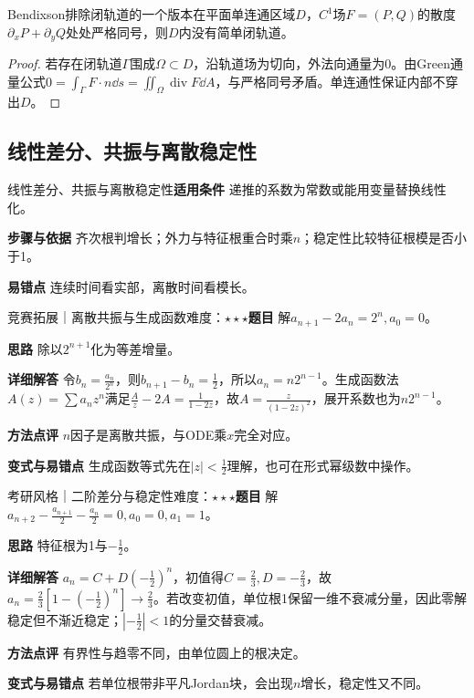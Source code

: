 \begin{theorem}{Bendixson排除闭轨道的一个版本}在平面单连通区域$D$，$C^1$场$F=(P,Q)$的散度$\partial_xP+\partial_yQ$处处严格同号，则$D$内没有简单闭轨道。\end{theorem}\begin{proof}若存在闭轨道$\Gamma$围成$\Omega\subset D$，沿轨道场为切向，外法向通量为0。由Green通量公式$0=\int_\Gamma F\cdot n\dd s=\iint_\Omega\operatorname{div}F\dd A$，与严格同号矛盾。单连通性保证内部不穿出$D$。\end{proof}

\subsection{线性差分、共振与离散稳定性}\label{deep:ode_qualitative_deep:difference}

\begin{method}{线性差分、共振与离散稳定性}\textbf{适用条件} 递推的系数为常数或能用变量替换线性化。\par\textbf{步骤与依据} 齐次根判增长；外力与特征根重合时乘$n$；稳定性比较特征根模是否小于1。\par\textbf{易错点} 连续时间看实部，离散时间看模长。\end{method}

\begin{example}{竞赛拓展｜离散共振与生成函数}{难度：$\star\star\star$}\label{deep:ex:ode_qualitative_deep:diffresonance}\textbf{题目} 解$a_{n+1}-2a_n=2^n,a_0=0$。\par\textbf{思路} 除以$2^{n+1}$化为等差增量。\par\textbf{详细解答} 令$b_n=\frac{a_n}{2^n}$，则$b_{n+1}-b_n=\frac{1}{2}$，所以$a_n=n2^{n-1}$。生成函数法$A(z)=\sum a_nz^n$满足$\frac{A}{z}-2A=\frac{1}{1-2z}$，故$A=\frac{z}{(1-2z)^2}$，展开系数也为$n2^{n-1}$。\par\textbf{方法点评} $n$因子是离散共振，与ODE乘$x$完全对应。\par\textbf{变式与易错点} 生成函数等式先在$|z|<\frac{1}{2}$理解，也可在形式幂级数中操作。\end{example}

\begin{example}{考研风格｜二阶差分与稳定性}{难度：$\star\star\star$}\label{deep:ex:ode_qualitative_deep:secondrec}\textbf{题目} 解$a_{n+2}-\frac{a_{n+1}}{2}-\frac{a_n}{2}=0,a_0=0,a_1=1$。\par\textbf{思路} 特征根为1与$-\frac{1}{2}$。\par\textbf{详细解答} $a_n=C+D(-\frac{1}{2})^n$，初值得$C=\frac{2}{3},D=-\frac{2}{3}$，故$a_n=\frac23[1-(-\frac{1}{2})^n]\to\frac{2}{3}$。若改变初值，单位根1保留一维不衰减分量，因此零解稳定但不渐近稳定；$|-\frac{1}{2}|<1$的分量交替衰减。\par\textbf{方法点评} 有界性与趋零不同，由单位圆上的根决定。\par\textbf{变式与易错点} 若单位根带非平凡Jordan块，会出现$n$增长，稳定性又不同。\end{example}

